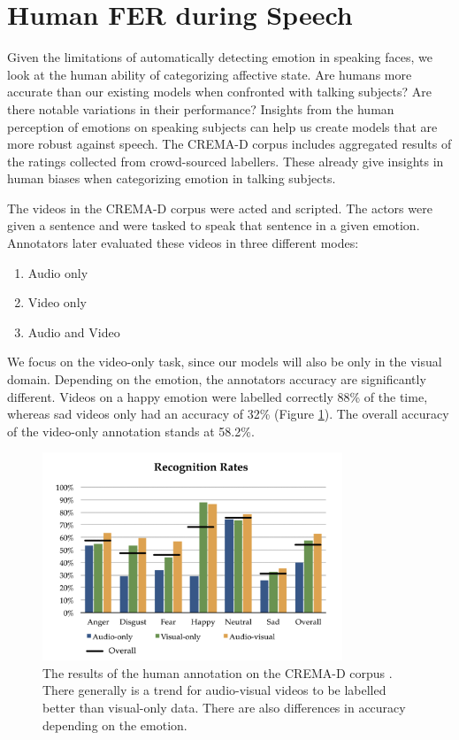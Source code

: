 \newpage
\section{Human FER during Speech}
\label{sec:human}
Given the limitations of automatically detecting emotion in speaking faces, we look at the human ability of categorizing affective state. Are humans more accurate than our existing models when confronted with talking subjects? Are there notable variations in their performance? Insights from the human perception of emotions on speaking subjects can help us create models that are more robust against speech. The CREMA-D corpus \cite{cao2014crema} includes aggregated results of the ratings collected from crowd-sourced labellers. These already give insights in human biases when categorizing emotion in talking subjects.

The videos in the CREMA-D corpus were acted and scripted. The actors were given a sentence and were tasked to speak that sentence in a given emotion. Annotators later evaluated these videos in three different modes:

\begin{enumerate}
    \item Audio only
    \item Video only
    \item Audio and Video
\end{enumerate}

We focus on the video-only task, since our models will also be only in the visual domain. Depending on the emotion, the annotators accuracy are significantly different. Videos on a happy emotion were labelled correctly 88\% of the time, whereas sad videos only had an accuracy of 32\% (Figure \ref{fig:crema_results}). The overall accuracy of the video-only annotation stands at 58.2\%.

\begin{figure}
    \centering
    \includegraphics[width=0.8\textwidth]{res/crema.png}
    \caption{The results of the human annotation on the CREMA-D corpus \cite{cao2014crema}. There generally is a trend for audio-visual videos to be labelled better than visual-only data. There are also differences in accuracy depending on the emotion.}
    \label{fig:crema_results}
\end{figure}

